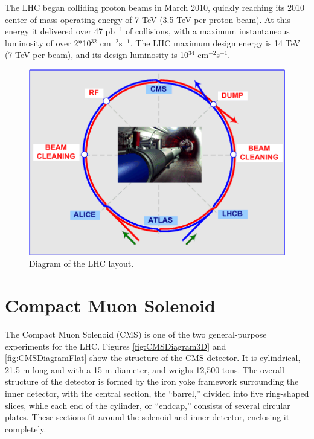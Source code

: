 The LHC began colliding proton beams in March 2010, 
quickly reaching its 2010 center-of-mass operating energy of 7 TeV
(3.5 TeV per proton beam).  
At this energy it delivered over 47 pb$^{-1}$ of collisions, 
with a maximum instantaneous luminosity of over 2*10$^{32}$ cm$^{-2}$s$^{-1}$.  
The LHC maximum design energy is 14 TeV (7 TeV per beam), 
and its design luminosity is 10$^{34}$ cm$^{-2}$s$^{-1}$.  

 \begin{figure}[htb]
  \begin{center}
    \includegraphics[width=360pt]{Figures/lhc-schematic-ml.png} 
  \end{center}
  \caption[\fixspacing Diagram of the LHC layout]
	  {\fixspacing Diagram of the LHC layout.}
  \label{fig:LHCDiagram}
 \end{figure}


\section{Compact Muon Solenoid}
\label{exp:CMS}


The Compact Muon Solenoid (CMS) \cite{CmsExperimentAtCernLHC}
is one of the two general-purpose experiments for the LHC.  
Figures \ref{fig:CMSDiagram3D} and \ref{fig:CMSDiagramFlat} 
show the structure of the CMS detector.  
It is cylindrical, 21.5 m long and with a 15-m diameter, and weighs 12,500 tons.  
The overall structure of the detector is formed by the iron yoke framework surrounding the inner detector,
with the central section, the ``barrel,'' divided into five ring-shaped slices, 
while each end of the cylinder, or ``endcap,'' consists of several circular plates.  
These sections fit around the solenoid and inner detector, enclosing it completely.  


